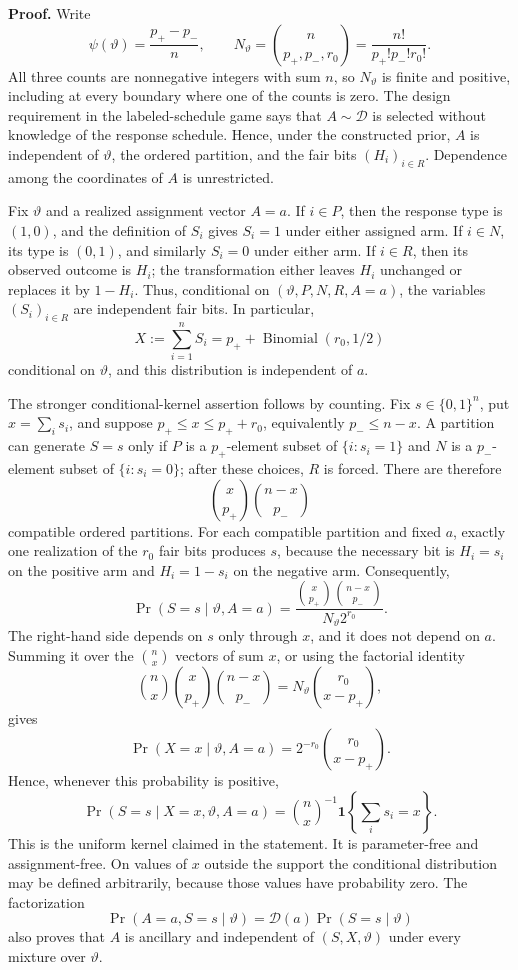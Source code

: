\textbf{Proof.}
Write
\[
 \psi(\vartheta)=\frac{p_+-p_-}{n},
 \qquad
 N_\vartheta=\binom{n}{p_+,p_-,r_0}
 =\frac{n!}{p_+!p_-!r_0!}.
\]
All three counts are nonnegative integers with sum \(n\), so \(N_\vartheta\) is finite and positive, including at every boundary where one of the counts is zero. The design requirement in the labeled-schedule game says that \(A\sim\mathcal D\) is selected without knowledge of the response schedule. Hence, under the constructed prior, \(A\) is independent of \(\vartheta\), the ordered partition, and the fair bits \((H_i)_{i\in R}\). Dependence among the coordinates of \(A\) is unrestricted.

Fix \(\vartheta\) and a realized assignment vector \(A=a\). If \(i\in P\), then the response type is \((1,0)\), and the definition of \(S_i\) gives \(S_i=1\) under either assigned arm. If \(i\in N\), its type is \((0,1)\), and similarly \(S_i=0\) under either arm. If \(i\in R\), then its observed outcome is \(H_i\); the transformation either leaves \(H_i\) unchanged or replaces it by \(1-H_i\). Thus, conditional on \((\vartheta,P,N,R,A=a)\), the variables \((S_i)_{i\in R}\) are independent fair bits. In particular,
\[
 X:=\sum_{i=1}^nS_i
 =p_++\operatorname{Binomial}(r_0,1/2)
\]
conditional on \(\vartheta\), and this distribution is independent of \(a\).

The stronger conditional-kernel assertion follows by counting. Fix \(s\in\{0,1\}^n\), put \(x=\sum_i s_i\), and suppose \(p_+\leq x\leq p_++r_0\), equivalently \(p_-\leq n-x\). A partition can generate \(S=s\) only if \(P\) is a \(p_+\)-element subset of \(\{i:s_i=1\}\) and \(N\) is a \(p_-\)-element subset of \(\{i:s_i=0\}\); after these choices, \(R\) is forced. There are therefore
\[
 \binom{x}{p_+}\binom{n-x}{p_-}
\]
compatible ordered partitions. For each compatible partition and fixed \(a\), exactly one realization of the \(r_0\) fair bits produces \(s\), because the necessary bit is \(H_i=s_i\) on the positive arm and \(H_i=1-s_i\) on the negative arm. Consequently,
\[
 \Pr(S=s\mid\vartheta,A=a)
 =\frac{\binom{x}{p_+}\binom{n-x}{p_-}}
 {N_\vartheta 2^{r_0}}.
\]
The right-hand side depends on \(s\) only through \(x\), and it does not depend on \(a\). Summing it over the \(\binom nx\) vectors of sum \(x\), or using the factorial identity
\[
 \binom nx\binom{x}{p_+}\binom{n-x}{p_-}
 =N_\vartheta\binom{r_0}{x-p_+},
\]
gives
\[
 \Pr(X=x\mid\vartheta,A=a)
 =2^{-r_0}\binom{r_0}{x-p_+}.
\]
Hence, whenever this probability is positive,
\[
 \Pr(S=s\mid X=x,\vartheta,A=a)
 =\binom nx^{-1}\mathbf 1\!\left\{\sum_i s_i=x\right\}.
\]
This is the uniform kernel claimed in the statement. It is parameter-free and assignment-free. On values of \(x\) outside the support the conditional distribution may be defined arbitrarily, because those values have probability zero. The factorization
\[
 \Pr(A=a,S=s\mid\vartheta)
 =\mathcal D(a)\Pr(S=s\mid\vartheta)
\]
also proves that \(A\) is ancillary and independent of \((S,X,\vartheta)\) under every mixture over \(\vartheta\).

